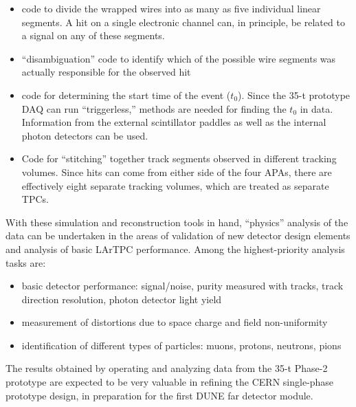 \begin{itemize}
\item{code to divide the wrapped wires into as many as five individual linear segments.
A hit on a single electronic channel can, in principle, be related to a
signal on any of these segments.}
\item{``disambiguation'' code to identify which of the possible wire segments was actually responsible
for the observed hit}
\item{code for determining the start time of the event ($t_0$). Since the 35-t prototype DAQ can
run ``triggerless,'' methods are needed for finding the $t_0$ in data. Information from the external
scintillator paddles as well as the internal photon detectors can be used.}
\item{Code for ``stitching'' together track segments observed in different tracking volumes.
Since hits can come from either side of the four APAs, there are
effectively eight separate tracking volumes,
which are treated as separate TPCs.}
\end{itemize}

With these simulation and reconstruction tools in hand, ``physics''
analysis of the data can be undertaken in the areas of validation of
new detector design elements and analysis of basic LArTPC performance.
Among the highest-priority analysis tasks are:
\begin{itemize}
\item{basic detector performance: signal/noise, purity measured with tracks, track direction resolution,
photon detector light yield}
\item{measurement of distortions due to space charge and field non-uniformity}
\item{identification of different types of particles: muons, protons, neutrons, pions}
\end{itemize}

The results obtained by operating and analyzing data from the 35-t
Phase-2 prototype are expected to be very valuable in refining the
CERN single-phase prototype design, in preparation for the first
 DUNE far detector module.
